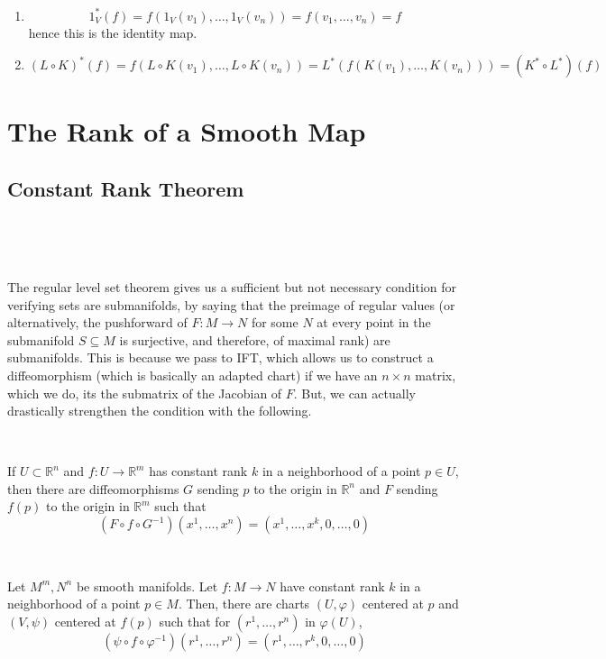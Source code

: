 \documentclass{article}
\begin{document}
\begin{customproof}
  \

  \begin{enumerate}
    \item $$1_V^*(f) = f(1_V(v_1), \dots, 1_V(v_n)) = f(v_1, \dots, v_n) = f$$hence this is the identity map.
    \item $$(L \circ K)^*(f) = f(L \circ K(v_1), \dots, L \circ K(v_n)) = L^*(f(K(v_1), \dots, K(v_n))) = (K^* \circ L^*)(f)$$
  \end{enumerate}
\end{customproof}

\section{The Rank of a Smooth Map}

\subsection{Constant Rank Theorem}
\

\begin{remark}
  \

  The regular level set theorem gives us a sufficient but not necessary condition for verifying sets are submanifolds, by saying that the preimage of regular values (or alternatively, the pushforward of $F: M \to N$ for some $N$ at every point in the submanifold $S \subseteq M$ is surjective, and therefore, of maximal rank) are submanifolds. This is because we pass to IFT, which allows us to construct a diffeomorphism (which is basically an adapted chart) if we have an $n \times n$ matrix, which we do, its the submatrix of the Jacobian of $F$. But, we can actually drastically strengthen the condition with the following.
\end{remark}

\begin{theorem}
  \

  If $U \subset \mathbb{R}^n$ and $f: U \to \mathbb{R}^m$ has constant rank $k$ in a neighborhood of a point $p \in U$, then there are diffeomorphisms $G$ sending $p$ to the origin in $\mathbb{R}^n$ and $F$ sending $f(p)$ to the origin in $\mathbb{R}^m$ such that $$(F \circ f \circ G ^{-1})(x^1, \dots, x^n) = (x^1, \dots, x^k, 0, \dots, 0)$$
\end{theorem}

\begin{theorem}
  \

  Let $M^m, N^n$ be smooth manifolds. Let $f: M \to N$ have constant rank $k$ in a neighborhood of a point $p \in M$. Then, there are charts $(U, \varphi)$ centered at $p$ and $(V,\psi)$ centered at $f(p)$ such that for $(r^1, \dots, r^n)$ in $\varphi(U)$, $$(\psi \circ f \circ \varphi ^{-1})(r^1, \dots, r^n) = (r^1, \dots, r^k, 0, \dots, 0)$$
\end{theorem}
\end{document}
